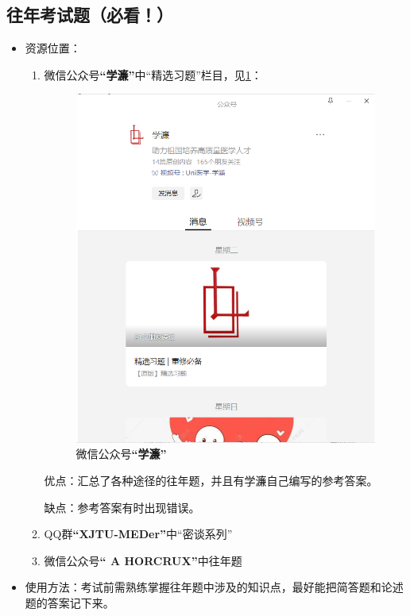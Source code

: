 \documentclass[zihao=-4,fontset=none]{Beautybook-CN}
\begin{document}
\subsection{往年考试题（必看！）}

\begin{itemize}
	\item 资源位置：
	      \begin{enumerate}
	      	\item 微信公众号\textbf{“学濂”}中“精选习题”栏目，见\ref{fig:xuelian}：
	      	      	      	      
	      	      \begin{figure}[htbp]
	      	      	\centering
	      	      	\includegraphics[width=1\textwidth]{media/image1.png}
	      	      	\caption{微信公众号\textbf{“学濂”}}
	      	      	\label{fig:xuelian}
	      	      \end{figure}
	      	      	      	      
	      	      优点：汇总了各种途径的往年题，并且有学濂自己编写的参考答案。
	      	      	      	      
	      	      缺点：参考答案有时出现错误。
	      	\item QQ群\textbf{“XJTU-MEDer”}中“密谈系列”
	      	\item 微信公众号\textbf{“ A HORCRUX”}中往年题
	      \end{enumerate}
	      	      
	\item 使用方法：考试前需熟练掌握往年题中涉及的知识点，最好能把简答题和论述题的答案记下来。
\end{itemize}
\end{document}
